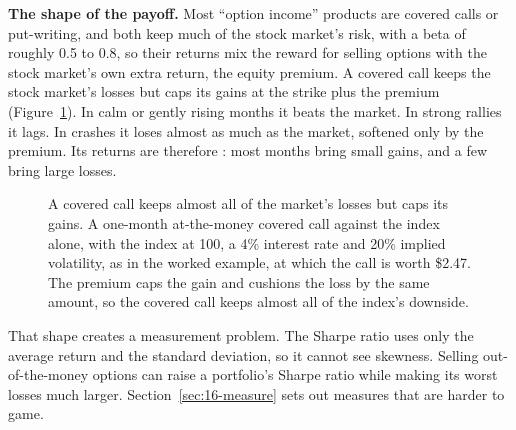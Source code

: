 \textbf{The shape of the payoff.} Most ``option income'' products are covered calls or put-writing, and both keep much of the stock market's risk, with a beta of roughly 0.5 to 0.8, so their returns mix the reward for selling options with the stock market's own extra return, the equity premium. A covered call keeps the stock market's losses but caps its gains at the strike plus the premium (Figure~\ref{fig:16-cc}). In calm or gently rising months it beats the market. In strong rallies it lags. In crashes it loses almost as much as the market, softened only by the premium. Its returns are therefore : most months bring small gains, and a few bring large losses.

\begin{figure}[htbp]
\centering
{}
\caption{A covered call keeps almost all of the market's losses but caps its gains. A one-month at-the-money covered call against the index alone, with the index at 100, a 4\% interest rate and 20\% implied volatility, as in the worked example, at which the call is worth \$2.47. The premium caps the gain and cushions the loss by the same amount, so the covered call keeps almost all of the index's downside.}
\label{fig:16-cc}
\end{figure}

That shape creates a measurement problem. The Sharpe ratio uses only the average return and the standard deviation, so it cannot see skewness. Selling out-of-the-money options can raise a portfolio's Sharpe ratio while making its worst losses much larger. Section~\ref{sec:16-measure} sets out measures that are harder to game.


